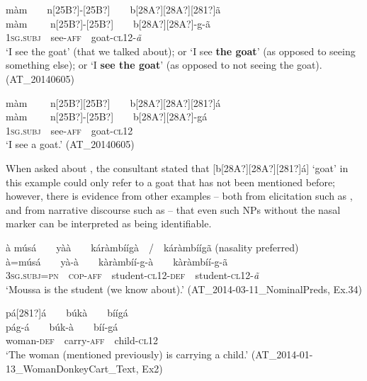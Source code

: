 \documentclass[output=paper]{langsci/langscibook}
\begin{document}
\ea\label{ex:teo:48}
\label{bkm:Ref264214237}m\`{a}m\ \  \ \ n[25B?]\nobreakdash-[25B?]\ \ \ \ b[28A?][28A?][281?]\~{a}\\
\gll m\`{a}m \ \ \ \ n[25B?]\nobreakdash-[25B?]\ \ \ \ b[28A?][28A?]-g\nobreakdash-\~{a}\\
\textsc{1sg.subj}\ \ see-\textsc{aff}\ \ goat-\textsc{cl12}{}-\textit{\~{a}}\\
\glt ‘I see the goat’ (that we talked about); or ‘I see \textbf{the goat}’ (as opposed to seeing something else); or ‘I \textbf{see the goat}’ (as opposed to not seeing the goat). (AT\_20140605)
\z

\ea\label{ex:teo:49}
\label{bkm:Ref264214255}m\`{a}m \ \ \ \ n[25B?][25B?]\ \ \ \ b[28A?][28A?][281?]\'{a}\\
\gll m\`{a}m \ \ \ \ n[25B?]\nobreakdash-[25B?]\ \ \ \ b[28A?][28A?]-g\'{a}\\
\textsc{1sg.subj}\ \ see-\textsc{aff}\ \ goat-\textsc{cl12}\\
\glt ‘I see a goat.’ (AT\_20140605)
\z

When asked about , the consultant stated that [b[28A?][28A?][281?]á] ‘goat’ in this example could only refer to a goat that has not been mentioned before; however, there is evidence from other examples – both from elicitation such as , and from narrative discourse such as  – that even such NPs without the nasal marker can be interpreted as being identifiable.

\ea\label{ex:teo:50}
\label{bkm:Ref264214264}à músá\ \ \ \ y\`{a}\`{a}\ \ \ \ káràmb\'{i}\'{i}g\`{a}\ \ /\ \ káràmb\'{i}\'{i}g\~{a} (nasality preferred)\\
\gll à=músá\ \ \ \ y\`{a}-\`{a}\ \ \ \ k\`{a}ràmb\'{i}\'{i}\nobreakdash-g\nobreakdash-\`{a}\ \ \ \ k\`{a}ràmb\'{i}\'{i}\nobreakdash-g\nobreakdash-\~{a}\\
\textsc{3sg.subj=pn\ \ cop-aff}\ \ student\nobreakdash-\textsc{cl12\nobreakdash-def}\textit{\ \ }student\nobreakdash-\textsc{cl12}\nobreakdash-\textit{\~{a}}\\
\glt ‘Moussa is the student (we know about).’ (AT\_2014-03-11\_NominalPreds, Ex.34)
\z

\ea\label{ex:teo:51}
\label{bkm:Ref432767156}pá[281?]á\ \ \ \ búkà\ \ \ \ bíígá\\
\gll pág-á\ \ \ \ búk-à\ \ \ \ bíí-gá\\
woman-\textsc{def}\ \ carry-\textsc{aff}\ \ child-\textsc{cl12}\\
\glt ‘The woman (mentioned previously) is carrying a child.’ (AT\_2014-01-13\_WomanDonkeyCart\_Text, Ex2)
\z
\end{document}
